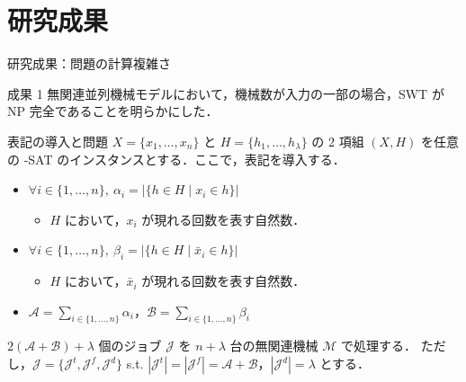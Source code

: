 \documentclass[dvipdfmx]{beamer}
\begin{document}
    \section{研究成果}
    \begin{frame}{研究成果：問題の計算複雑さ}
      \begin{alertblock}{成果 1}
        無関連並列機械モデルにおいて，機械数が入力の一部の場合，SWT が NP 完全であることを明らかにした．
      \end{alertblock}
      \begin{block}{表記の導入と問題}
        $X = \{x_1,\ldots,x_n\}$ と $H = \{h_1,\ldots,h_{\lambda}\}$ の 2 項組 $(X,H)$ を任意の {-SAT} のインスタンスとする．ここで，表記を導入する．
        \begin{itemize}
          \item $\forall i \in \{1,\ldots,n\},~\alpha_i = |\{h \in H \mid x_i \in h\}|$
          \begin{itemize}
            \item $H$ において，$x_i$ が現れる回数を表す自然数．
          \end{itemize}
          \item $\forall i \in \{1,\ldots,n\},~\beta_i = |\{h \in H \mid \bar x_i \in h\}|$
          \begin{itemize}
            \item $H$ において，$\bar x_i$ が現れる回数を表す自然数．
          \end{itemize}
          \item $\mathcal{A} = {\displaystyle \sum_{i \in \{1,\ldots,n\}}\alpha_i}$，$\mathcal{B} = {\displaystyle \sum_{i \in \{1,\ldots,n\}}\beta_i}$
        \end{itemize}

        $2(\mathcal{A} + \mathcal{B}) + \lambda$ 個のジョブ $\mathcal{J}$ を $n + \lambda$ 台の無関連機械 $\mathcal{M}$ で処理する．
        ただし，$\mathcal{J} = \{\mathcal{J}^t,\mathcal{J}^f,\mathcal{J}^d\}$ s.t. $|\mathcal{J}^t| = |\mathcal{J}^f| = \mathcal{A} + \mathcal{B}$，$|\mathcal{J}^d| = \lambda$ とする．
      \end{block}
    \end{frame}
\end{document}
